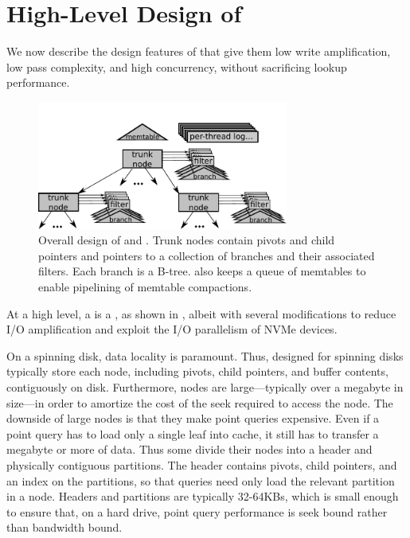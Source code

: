 \section{High-Level Design of \datastructs}\label{sec:design}

We now describe the design features of \datastructs that give them 
low write amplification, low pass complexity, and high
concurrency, without sacrificing lookup performance.

\begin{figure}[t]
  \begin{center}
    \includegraphics[width=3.25in]{figures/stbetree-diagram.pdf}
    \caption{Overall design of \datastructs and \sysname.  Trunk
      nodes contain pivots and child pointers and pointers to a
      collection of branches and their associated filters.  Each branch
      is a B-tree.  \sysname also keeps a queue of memtables to
      enable pipelining of memtable
      compactions.}
    \label{fig:stbetree}
  \end{center}
\end{figure}

At a high level, a \datastruct is a \bet, as shown in
, albeit with several modifications to reduce I/O
amplification and exploit the I/O parallelism of NVMe devices.

On a spinning disk, data locality is paramount.  Thus, \bets designed
for spinning disks typically store each node, including pivots, child
pointers, and buffer contents, contiguously on disk.  Furthermore,
nodes are large---typically over a megabyte in size---in order to
amortize the cost of the seek required to access the node.  The
downside of large nodes is that they make point queries expensive.
Even if a point query has to load only a single leaf into cache, it
still has to transfer a megabyte or more of data.  Thus some \bets
divide their nodes into a header and physically contiguous
partitions.  The header contains pivots, child pointers, and an
index on the partitions, so that queries need only load the relevant
partition in a node.  Headers and partitions are typically 32-64KBs,
which is small enough to ensure that, on a hard drive, point query performance is seek
bound rather than bandwidth bound.

